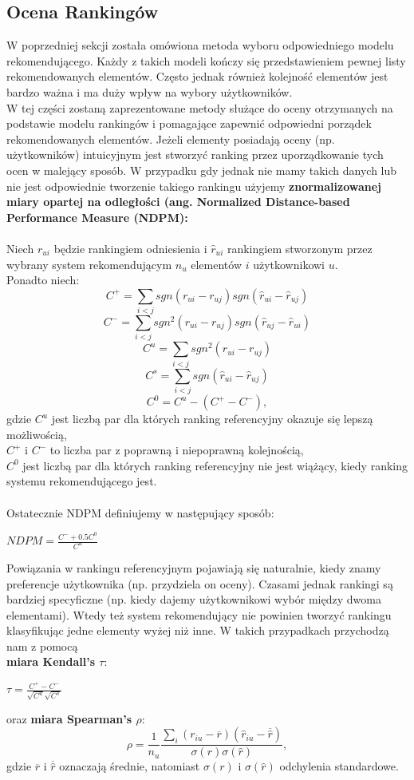 \documentclass[12pt,a4paper]{report}
\begin{document}
\subsection{Ocena Rankingów}
W poprzedniej sekcji została omówiona metoda wyboru odpowiedniego modelu rekomendującego. Każdy z takich modeli kończy się przedstawieniem pewnej listy rekomendowanych elementów. Często jednak również kolejność elementów jest bardzo ważna i ma duży wpływ na wybory użytkowników.
\\W tej części zostaną zaprezentowane metody służące do oceny otrzymanych na podstawie modelu rankingów i pomagające zapewnić odpowiedni porządek rekomendowanych elementów. Jeżeli elementy posiadają oceny (np. użytkowników) intuicyjnym jest stworzyć ranking przez uporządkowanie tych ocen w malejący sposób. W przypadku gdy jednak nie mamy takich danych lub nie jest odpowiednie tworzenie takiego rankingu użyjemy \textbf{znormalizowanej miary opartej na odległości (ang. Normalized Distance-based Performance Measure (NDPM): }
\\
\\Niech $r_{ui}$ będzie rankingiem odniesienia i $\widehat{r}_{ui}$ rankingiem stworzonym przez wybrany system rekomendującym $n_u$ elementów $i$ użytkownikowi $u$. 
\\Ponadto niech:
$$C^{+} = \sum_{i<j} sgn(r_{ui} - r_{uj})sgn(\widehat{r}_{ui}-\widehat{r}_{uj})$$
$$C^{-} = \sum_{i<j} sgn^{2}(r_{ui} - r_{uj})sgn(\widehat{r}_{uj}-\widehat{r}_{ui})$$
$$C^{u} = \sum_{i<j} sgn^{2}(r_{ui} - r_{uj})$$
$$C^{s} = \sum_{i<j} sgn(\widehat{r}_{ui}-\widehat{r}_{uj})$$
$$C^{0}=C^{u}-(C^{+}-C^{-}),$$ gdzie
$C^{u}$ jest liczbą par dla których ranking referencyjny okazuje się lepszą możliwością, 
\\$C^{+}$ i $C^{-}$ to liczba par z poprawną i niepoprawną kolejnością,
\\$C^{0}$ jest liczbą par dla których ranking referencyjny nie jest wiążący, kiedy ranking systemu rekomendującego jest.
\\
\\Ostatecznie NDPM definiujemy w następujący sposób:
\begin{center}
$NDPM = \frac{C^{-} + 0.5 C^{0}}{C^{u}}$
\end{center}
Powiązania w rankingu referencyjnym pojawiają się naturalnie, kiedy znamy preferencje użytkownika (np. przydziela on oceny). Czasami jednak rankingi są bardziej specyficzne (np. kiedy dajemy użytkownikowi wybór między dwoma elementami). Wtedy też system rekomendujący nie powinien tworzyć rankingu klasyfikując jedne elementy wyżej niż inne. W takich przypadkach przychodzą nam z pomocą 
\\\textbf{miara Kendall's $\tau$}:
\begin{center}
$\tau = \frac{C^{+} - C^{-} }{\sqrt{C^{u}}\sqrt{C^{s}}}$
\end{center}
oraz \textbf{miara Spearman's $\rho$}:
$$\rho = \frac{1}{n_{u}}\frac{\sum_i (r_{iu} - \overline{r})(\widehat{r}_{iu}-\overline{\widehat{r}})}{\sigma(r)\sigma(\widehat{r})},$$
gdzie $\overline{r}$ i $\overline{\widehat{r}}$ oznaczają średnie, natomiast $\sigma(r)$ i $\sigma(\widehat{r})$ odchylenia standardowe.
\end{document}
